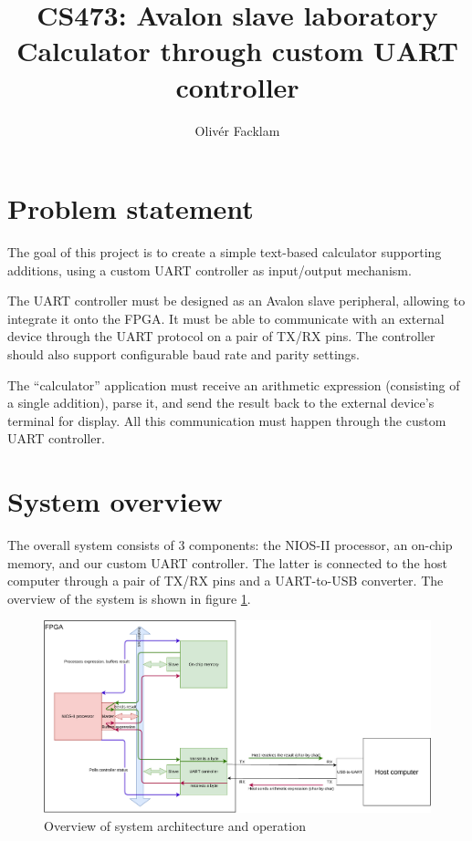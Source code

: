 \documentclass[12pt,a4paper]{article}
\author{Olivér Facklam}
\title{CS473: Avalon slave laboratory\\Calculator through custom UART controller}
\begin{document}
\maketitle
\tableofcontents

\section{Problem statement}

The goal of this project is to create a simple text-based calculator supporting additions, using a custom UART controller as input/output mechanism.

The UART controller must be designed as an Avalon slave peripheral, allowing to integrate it onto the FPGA. It must be able to communicate with an external device through the UART protocol on a pair of TX/RX pins. The controller should also support configurable baud rate and parity settings.

The ``calculator'' application must receive an arithmetic expression (consisting of a single addition), parse it, and send the result back to the external device's terminal for display. All this communication must happen through the custom UART controller.


\section{System overview}

The overall system consists of 3 components: the NIOS-II processor, an on-chip memory, and our custom UART controller. The latter is connected to the host computer through a pair of TX/RX pins and a UART-to-USB converter. The overview of the system is shown in figure \ref{fig:system}.

\begin{figure}[h]
	\centering
	\includegraphics[width=\textwidth]{system}
	\caption{Overview of system architecture and operation}
	\label{fig:system}
\end{figure}
\end{document}
